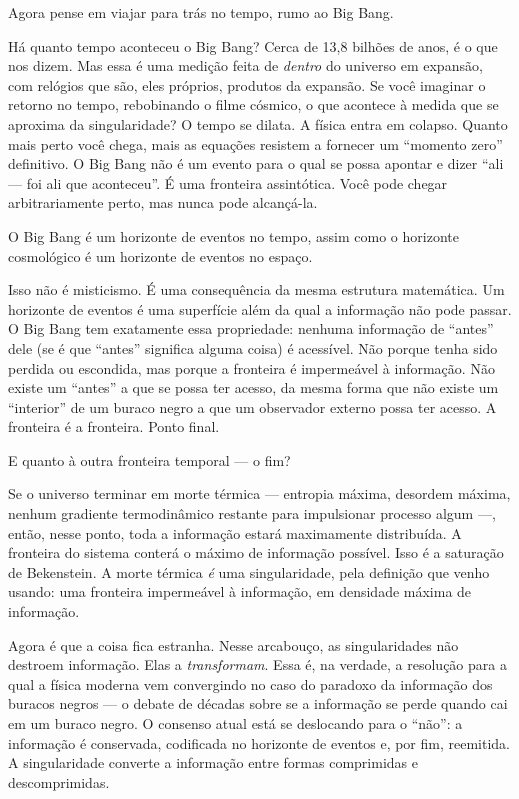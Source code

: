 \documentclass[11pt, twoside, openright]{book}
\begin{document}
Agora pense em viajar para trás no tempo, rumo ao Big Bang.

Há quanto tempo aconteceu o Big Bang? Cerca de 13,8 bilhões de anos, é o que nos dizem. Mas essa é uma medição feita de \textit{dentro} do universo em expansão, com relógios que são, eles próprios, produtos da expansão. Se você imaginar o retorno no tempo, rebobinando o filme cósmico, o que acontece à medida que se aproxima da singularidade? O tempo se dilata. A física entra em colapso. Quanto mais perto você chega, mais as equações resistem a fornecer um ``momento zero'' definitivo. O Big Bang não é um evento para o qual se possa apontar e dizer ``ali --- foi ali que aconteceu''. É uma fronteira assintótica. Você pode chegar arbitrariamente perto, mas nunca pode alcançá-la.

O Big Bang é um horizonte de eventos no tempo, assim como o horizonte cosmológico é um horizonte de eventos no espaço.

Isso não é misticismo. É uma consequência da mesma estrutura matemática. Um horizonte de eventos é uma superfície além da qual a informação não pode passar. O Big Bang tem exatamente essa propriedade: nenhuma informação de ``antes'' dele (se é que ``antes'' significa alguma coisa) é acessível. Não porque tenha sido perdida ou escondida, mas porque a fronteira é impermeável à informação. Não existe um ``antes'' a que se possa ter acesso, da mesma forma que não existe um ``interior'' de um buraco negro a que um observador externo possa ter acesso. A fronteira é a fronteira. Ponto final.

E quanto à outra fronteira temporal --- o fim?

Se o universo terminar em morte térmica --- entropia máxima, desordem máxima, nenhum gradiente termodinâmico restante para impulsionar processo algum ---, então, nesse ponto, toda a informação estará maximamente distribuída. A fronteira do sistema conterá o máximo de informação possível. Isso é a saturação de Bekenstein. A morte térmica \textit{é} uma singularidade, pela definição que venho usando: uma fronteira impermeável à informação, em densidade máxima de informação.

Agora é que a coisa fica estranha. Nesse arcabouço, as singularidades não destroem informação. Elas a \textit{transformam}. Essa é, na verdade, a resolução para a qual a física moderna vem convergindo no caso do paradoxo da informação dos buracos negros --- o debate de décadas sobre se a informação se perde quando cai em um buraco negro. O consenso atual está se deslocando para o ``não'': a informação é conservada, codificada no horizonte de eventos e, por fim, reemitida. A singularidade converte a informação entre formas comprimidas e descomprimidas.
\end{document}
